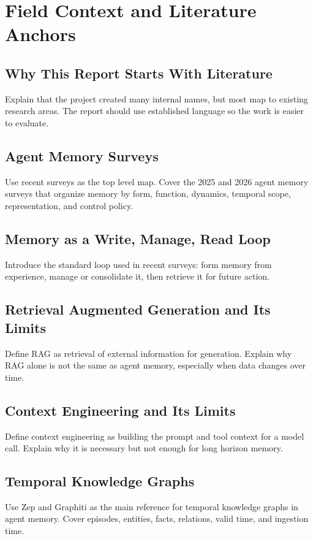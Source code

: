 \documentclass[11pt]{article}
\begin{document}
\section{Field Context and Literature Anchors}

\subsection{Why This Report Starts With Literature}
Explain that the project created many internal names, but most map to existing research areas. The report should use established language so the work is easier to evaluate.

\subsection{Agent Memory Surveys}
Use recent surveys as the top level map. Cover the 2025 and 2026 agent memory surveys that organize memory by form, function, dynamics, temporal scope, representation, and control policy.

\subsection{Memory as a Write, Manage, Read Loop}
Introduce the standard loop used in recent surveys: form memory from experience, manage or consolidate it, then retrieve it for future action.

\subsection{Retrieval Augmented Generation and Its Limits}
Define RAG as retrieval of external information for generation. Explain why RAG alone is not the same as agent memory, especially when data changes over time.

\subsection{Context Engineering and Its Limits}
Define context engineering as building the prompt and tool context for a model call. Explain why it is necessary but not enough for long horizon memory.

\subsection{Temporal Knowledge Graphs}
Use Zep and Graphiti as the main reference for temporal knowledge graphs in agent memory. Cover episodes, entities, facts, relations, valid time, and ingestion time.
\end{document}
